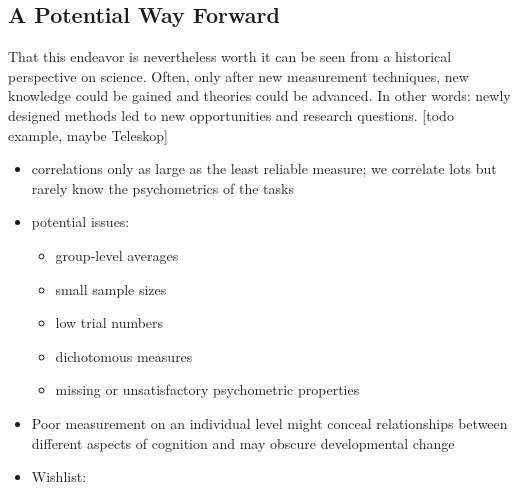 \documentclass[
]{scrbook}
\providecommand{\tightlist}{%
  \setlength{\itemsep}{0pt}\setlength{\parskip}{0pt}}
\begin{document}
\subsection{A Potential Way Forward}\label{a-potential-way-forward}

That this endeavor is nevertheless worth it can be seen from a historical perspective on science. Often, only after new measurement techniques, new knowledge could be gained and theories could be advanced. In other words: newly designed methods led to new opportunities and research questions. {[}todo example, maybe Teleskop{]}

\begin{itemize}
\item
  correlations only as large as the least reliable measure; we correlate lots but rarely know the psychometrics of the tasks
\item
  potential issues:

  \begin{itemize}
  \tightlist
  \item
    group-level averages
  \item
    small sample sizes
  \item
    low trial numbers
  \item
    dichotomous measures
  \item
    missing or unsatisfactory psychometric properties
  \end{itemize}
\item
  Poor measurement on an individual level might conceal relationships between different aspects of cognition and may obscure developmental change
\item
  Wishlist:


\end{itemize}
\end{document}
